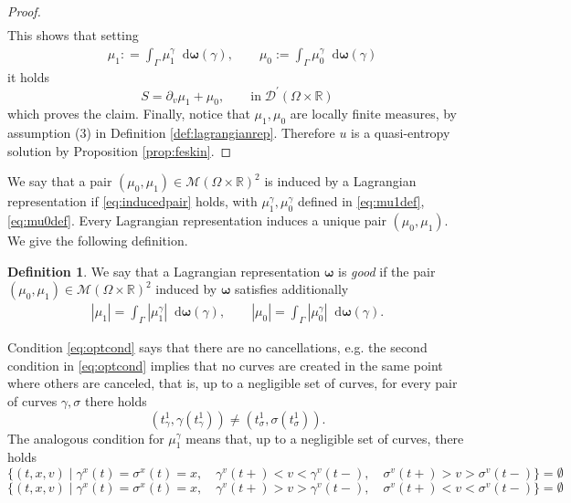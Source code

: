 \documentclass[11pt, twoside, reqno]{amsart}
\theoremstyle{definition}
\newtheorem{defi}[thm]{Definition}
\theoremstyle{remark}
\numberwithin{equation}{section}
\newcommand*\dif{\mathop{}\!\mathrm{d}}
\newcommand{\bs}[1]{\boldsymbol{#1}}
\newcommand{\msc}[1]{\mathscr{#1}}
\begin{document}
\begin{proof}
\begin{equation}
\begin{aligned}
    \end{aligned}
\end{equation}
This shows that setting 
\begin{equation}\label{eq:inducedpair}
\begin{aligned}
    & \mu_1 : = \int_{\Gamma} \mu_1^{\gamma}\dif \bs \omega(\gamma), \qquad \mu_0 := \int_{\Gamma} \mu_0^{\gamma} \dif \bs \omega(\gamma)
    \end{aligned}
\end{equation}
it holds
\begin{equation}
    S = \partial_v \mu_1 + \mu_0, \qquad \text{in} \; \msc D^{\prime} (\Omega \times \mathbb R)
\end{equation}
    which proves the claim. Finally, notice that $\mu_1, \mu_0$ are locally finite measures, by assumption (3) in Definition \ref{def:lagrangianrep}. Therefore $u$ is a quasi-entropy solution by Proposition \ref{prop:feskin}.
\end{proof}

We say that a pair $(\mu_0, \mu_1) \in \mathscr M(\Omega \times \mathbb R)^2$ is induced by a Lagrangian representation if \eqref{eq:inducedpair} holds, with $\mu_1^{\gamma}, \mu_0^{\gamma}$ defined in \eqref{eq:mu1def}, \eqref{eq:mu0def}. Every Lagrangian representation induces a unique pair $(\mu_0, \mu_1)$.
We give the following definition.
\begin{defi}\label{defi:goodlr}
We say that a Lagrangian representation $\bs \omega$ is \emph{good} if the pair $(\mu_0, \mu_1) \in \mathscr M(\Omega \times \mathbb R)^2$ induced by $\bs \omega$ satisfies additionally
\begin{equation}\label{eq:optcond}
    \begin{aligned}
        \left| \mu_1 \right| = \int_{\Gamma} |\mu_1^{\gamma}| \dif \bs \omega(\gamma), \qquad \left| \mu_0 \right| = \int_{\Gamma} |\mu_0^{\gamma}| \dif \bs \omega(\gamma).
    \end{aligned}
\end{equation}
\end{defi}

Condition \eqref{eq:optcond}  says that there are no cancellations, e.g. the second condition in \eqref{eq:optcond} implies that no curves are created in the same point where others are canceled, that is, up to a negligible set of curves, for every pair of curves $\gamma, \sigma$ there holds
$$
(t_\gamma^1, \gamma(t_\gamma^1)) \neq (t_\sigma^1, \sigma(t_\sigma^1)) .
$$
The analogous condition for $\mu_1^\gamma$ means that, up to a negligible set of curves, there holds
$$
\{(t,x,v) \;  | \; \gamma^x(t) = \sigma^x(t) = x, \quad \gamma^v(t+) < v < \gamma^v(t-), \quad \sigma^v(t+) > v > \sigma^v(t-)\} = \emptyset
$$
$$
\{(t,x,v) \;  | \; \gamma^x(t) = \sigma^x(t) = x, \quad \gamma^v(t+) > v > \gamma^v(t-), \quad \sigma^v(t+) < v < \sigma^v(t-)\} = \emptyset
$$
\end{document}
